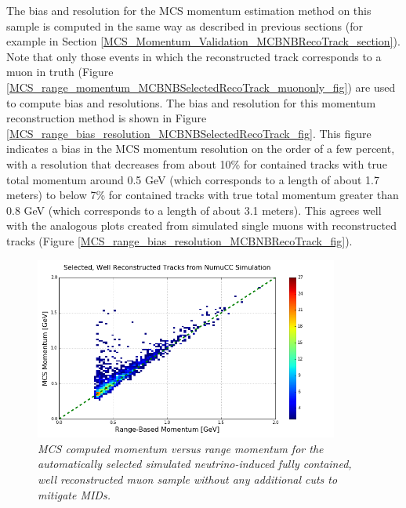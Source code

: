 The bias and resolution for the MCS momentum estimation method on this sample is computed in the same way as described in previous sections (for example in Section \ref{MCS_Momentum_Validation_MCBNBRecoTrack_section}). Note that only those events in which the reconstructed track corresponds to a muon in truth (Figure \ref{MCS_range_momentum_MCBNBSelectedRecoTrack_muononly_fig}) are used to compute bias and resolutions. The bias and resolution for this momentum reconstruction method is shown in Figure \ref{MCS_range_bias_resolution_MCBNBSelectedRecoTrack_fig}. This figure indicates a bias in the MCS momentum resolution on the order of a few percent, with a resolution that decreases from about 10\% for contained tracks with true total momentum around 0.5 GeV (which corresponds to a length of about 1.7 meters) to below 7\% for contained tracks with true total momentum greater than 0.8 GeV (which corresponds to a length of about 3.1 meters). This agrees well with the analogous plots created from simulated single muons with reconstructed tracks (Figure \ref{MCS_range_bias_resolution_MCBNBRecoTrack_fig}).


\begin{figure}[ht!]
\begin{center}
\includegraphics[width=100mm]{Figures/MCS_range_comparison_MCBNBSelectedRecoTrack.png}
\end{center}
\caption{\textit{MCS computed momentum versus range momentum for the automatically selected simulated neutrino-induced fully contained, well reconstructed muon sample without any additional cuts to mitigate MIDs.}}
\label{MCS_range_momentum_MCBNBSelectedRecoTrack_noPDGcut_fig}
\end{figure}

